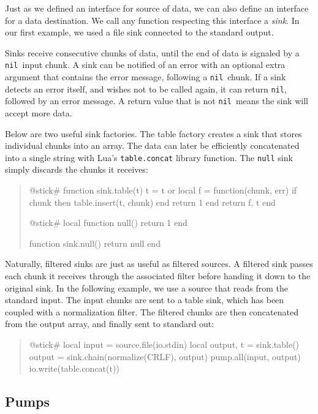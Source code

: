 \documentclass[10pt]{article}
\newcommand{\nil}{\texttt{nil}}
\begin{document}
Just as we defined an interface for source of data, 
we can also define an interface for a data destination. 
We call any function respecting this
interface a \emph{sink}. In our first example, we used a
file sink connected to the standard output. 

Sinks receive consecutive chunks of data, until the end of
data is signaled by a \nil\ input chunk. A sink can be
notified of an error with an optional extra argument that
contains the error message, following a \nil\ chunk.  
If a sink detects an error itself, and
wishes not to be called again, it can return \nil,
followed by an error message. A return value that
is not \nil\ means the sink will accept more data.

Below are two useful sink factories. 
The table factory creates a sink that stores
individual chunks into an array. The data can later be
efficiently concatenated into a single string with Lua's
\texttt{table.concat} library function. The \texttt{null} sink 
simply discards the chunks it receives:
\begin{quote}
\begin{lua}
@stick#
function sink.table(t)
  t = t or {}
  local f = function(chunk, err)
    if chunk then table.insert(t, chunk) end
    return 1
  end
  return f, t
end
%

@stick#
local function null()
  return 1
end

function sink.null()
  return null
end
%
\end{lua}
\end{quote}

Naturally, filtered sinks are just as useful as filtered
sources. A filtered sink passes each chunk it receives
through the associated filter before handing it down to the
original sink.  In the following example, we use a source
that reads from the standard input.  The input chunks are
sent to a table sink, which has been coupled with a
normalization filter.  The filtered chunks are then
concatenated from the output array, and finally sent to
standard out:
\begin{quote}
\begin{lua}
@stick#
local input = source.file(io.stdin)
local output, t = sink.table()
output = sink.chain(normalize(CRLF), output)
pump.all(input, output)
io.write(table.concat(t))
%
\end{lua}
\end{quote}

\subsection{Pumps}
\end{document}
